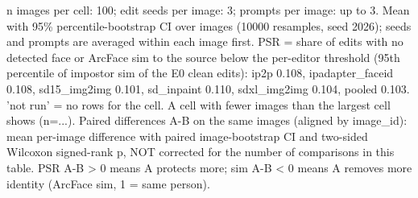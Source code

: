\begin{table}[t]
\par\footnotesize n images per cell: 100; edit seeds per image: 3; prompts per image: up to 3. Mean with 95\% percentile-bootstrap CI over images (10000 resamples, seed 2026); seeds and prompts are averaged within each image first. PSR = share of edits with no detected face or ArcFace sim to the source below the per-editor threshold (95th percentile of impostor sim of the E0 clean edits): ip2p 0.108, ipadapter\_faceid 0.108, sd15\_img2img 0.101, sd\_inpaint 0.110, sdxl\_img2img 0.104, pooled 0.103. 'not run' = no rows for the cell. A cell with fewer images than the largest cell shows (n=...). Paired differences A-B on the same images (aligned by image\_id): mean per-image difference with paired image-bootstrap CI and two-sided Wilcoxon signed-rank p, NOT corrected for the number of comparisons in this table. PSR A-B > 0 means A protects more; sim A-B < 0 means A removes more identity (ArcFace sim, 1 = same person).
\end{table}
